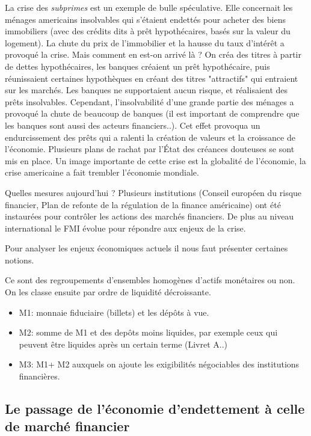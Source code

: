 La crise des \emph{subprimes} est un exemple de bulle spéculative. Elle concernait les ménages americains insolvables qui s'étaient endettés pour acheter des
biens immobiliers (avec des crédits dits à prêt hypothécaires, basés sur la valeur du logement). La chute du prix de l'immobilier et la hausse du taux d'intérêt a 
provoqué la crise. Mais comment en est-on arrivé là ? On créa des titres à partir de dettes hypothécaires, les banques créaient un prêt hypothécaire, puis réunissaient 
certaines hypothèques en créant des titres "attractifs" qui entraient sur les marchés. Les banques ne supportaient aucun risque, et réalisaient des prêts 
insolvables. Cependant, l'insolvabilité d'une grande partie des ménages a provoqué la chute de beaucoup de banques (il est important de comprendre que les 
banques sont aussi des acteurs financiers..). Cet effet provoqua un endurcissement des prêts qui a ralenti la création de valeurs et la croissance de 
l'économie. Plusieurs plans de rachat par l'État des créances douteuses se sont mis en place. Un image importante de cette crise est la globalité de 
l'économie, la crise americaine a fait trembler l'économie mondiale. 

Quelles mesures aujourd'hui ? Plusieurs institutions (Conseil européen du risque financier, Plan de refonte de la régulation de la finance américaine) ont été
 instaurées pour contrôler les actions des marchés financiers. De plus au niveau international le FMI évolue pour répondre aux enjeux de la crise. 
 
Pour analyser les enjeux économiques actuels il nous faut présenter certaines notions.

\begin{tcolorbox}[title=Les agrégats monétaires]
	Ce sont des regroupements d'ensembles homogènes d'actifs monétaires ou non. On les classe ensuite par ordre de liquidité décroissante. 
	\begin{itemize}[label=]
		\item M1: monnaie fiduciaire (billets) et les dépôts à vue.
		\item M2: somme de M1 et des depôts moins liquides, par exemple ceux qui peuvent être liquides après un certain terme (Livret A..)
		\item M3: M1+ M2 auxquels on ajoute les exigibilités négociables des institutions financières.
	\end{itemize}
	
\end{tcolorbox}

\subsection{Le passage de l'économie d'endettement à celle de marché financier} %
\label{sec:le_passage_de_l_economie_d_endettement_a_celle_de_marche_financier}

